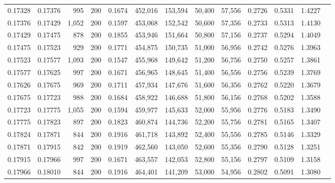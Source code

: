 \begin{tabular}{rrrrrrrrrrrrr}
0.17328 & 0.17376 &   995 & 200 &                                     0.1674 & 452,016 & 153,594 &  50,400 &  57,556 & 0.2726 & 0.5331 & 1.4227 \\
0.17376 & 0.17429 & 1,052 & 200 &                                     0.1597 & 453,068 & 152,542 &  50,600 &  57,356 & 0.2733 & 0.5313 & 1.4130 \\
0.17429 & 0.17475 &   878 & 200 &                                     0.1855 & 453,946 & 151,664 &  50,800 &  57,156 & 0.2737 & 0.5294 & 1.4049 \\
0.17475 & 0.17523 &   929 & 200 &                                     0.1771 & 454,875 & 150,735 &  51,000 &  56,956 & 0.2742 & 0.5276 & 1.3963 \\
0.17523 & 0.17577 & 1,093 & 200 &                                     0.1547 & 455,968 & 149,642 &  51,200 &  56,756 & 0.2750 & 0.5257 & 1.3861 \\
0.17577 & 0.17625 &   997 & 200 &                                     0.1671 & 456,965 & 148,645 &  51,400 &  56,556 & 0.2756 & 0.5239 & 1.3769 \\
0.17626 & 0.17675 &   969 & 200 &                                     0.1711 & 457,934 & 147,676 &  51,600 &  56,356 & 0.2762 & 0.5220 & 1.3679 \\
0.17675 & 0.17723 &   988 & 200 &                                     0.1684 & 458,922 & 146,688 &  51,800 &  56,156 & 0.2768 & 0.5202 & 1.3588 \\
0.17723 & 0.17775 & 1,055 & 200 &                                     0.1594 & 459,977 & 145,633 &  52,000 &  55,956 & 0.2776 & 0.5183 & 1.3490 \\
0.17775 & 0.17823 &   897 & 200 &                                     0.1823 & 460,874 & 144,736 &  52,200 &  55,756 & 0.2781 & 0.5165 & 1.3407 \\
0.17824 & 0.17871 &   844 & 200 &                                     0.1916 & 461,718 & 143,892 &  52,400 &  55,556 & 0.2785 & 0.5146 & 1.3329 \\
0.17871 & 0.17915 &   842 & 200 &                                     0.1919 & 462,560 & 143,050 &  52,600 &  55,356 & 0.2790 & 0.5128 & 1.3251 \\
0.17915 & 0.17966 &   997 & 200 &                                     0.1671 & 463,557 & 142,053 &  52,800 &  55,156 & 0.2797 & 0.5109 & 1.3158 \\
0.17966 & 0.18010 &   844 & 200 &                                     0.1916 & 464,401 & 141,209 &  53,000 &  54,956 & 0.2802 & 0.5091 & 1.3080 \\

\end{tabular}

